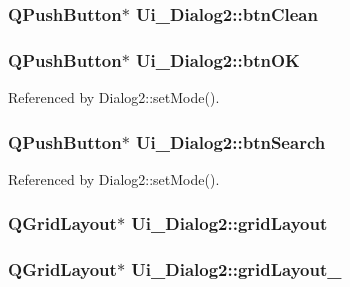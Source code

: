 \subsubsection[{btn\+Clean}]{\setlength{\rightskip}{0pt plus 5cm}Q\+Push\+Button$\ast$ Ui\+\_\+\+Dialog2\+::btn\+Clean}\label{class_ui___dialog2_a5b84762f1272faea5a7ea2bef366ac28}
\hypertarget{class_ui___dialog2_ae2f395441fa7b590592adb4559aac10d}{}
\subsubsection[{btn\+O\+K}]{\setlength{\rightskip}{0pt plus 5cm}Q\+Push\+Button$\ast$ Ui\+\_\+\+Dialog2\+::btn\+O\+K}\label{class_ui___dialog2_ae2f395441fa7b590592adb4559aac10d}


Referenced by Dialog2\+::set\+Mode().

\hypertarget{class_ui___dialog2_ad64c2baaea2e0e26e3dfdd1aa1be2dfa}{}
\subsubsection[{btn\+Search}]{\setlength{\rightskip}{0pt plus 5cm}Q\+Push\+Button$\ast$ Ui\+\_\+\+Dialog2\+::btn\+Search}\label{class_ui___dialog2_ad64c2baaea2e0e26e3dfdd1aa1be2dfa}


Referenced by Dialog2\+::set\+Mode().

\hypertarget{class_ui___dialog2_aadd721d82fa5bcc259b19dffe35ccd54}{}
\subsubsection[{grid\+Layout}]{\setlength{\rightskip}{0pt plus 5cm}Q\+Grid\+Layout$\ast$ Ui\+\_\+\+Dialog2\+::grid\+Layout}\label{class_ui___dialog2_aadd721d82fa5bcc259b19dffe35ccd54}
\hypertarget{class_ui___dialog2_a42b1df0591a2fb4341a45b336e72a180}{}
\subsubsection[{grid\+Layout\+\_\+2}]{\setlength{\rightskip}{0pt plus 5cm}Q\+Grid\+Layout$\ast$ Ui\+\_\+\+Dialog2\+::grid\+Layout\+\_}\label{class_ui___dialog2_a42b1df0591a2fb4341a45b336e72a180}
\hypertarget{class_ui___dialog2_ad162dcfb64716385a50954e495e7c49d}{}
